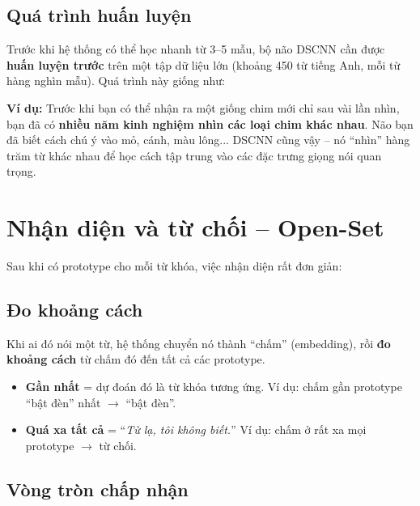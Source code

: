 \documentclass[12pt,a4paper]{article}
\begin{document}
\subsection{Quá trình huấn luyện}

Trước khi hệ thống có thể học nhanh từ 3--5 mẫu, bộ não DSCNN cần được
\textbf{huấn luyện trước} trên một tập dữ liệu lớn (khoảng 450 từ tiếng Anh,
mỗi từ hàng nghìn mẫu). Quá trình này giống như:

\begin{examplebox}
\textbf{Ví dụ:} Trước khi bạn có thể nhận ra một giống chim mới chỉ sau vài lần
nhìn, bạn đã có \textbf{nhiều năm kinh nghiệm nhìn các loại chim khác nhau}.
Não bạn đã biết cách chú ý vào mỏ, cánh, màu lông... DSCNN cũng vậy -- nó
``nhìn'' hàng trăm từ khác nhau để học cách tập trung vào các đặc trưng
giọng nói quan trọng.
\end{examplebox}


\section{Nhận diện và từ chối -- Open-Set}

Sau khi có prototype cho mỗi từ khóa, việc nhận diện rất đơn giản:

\subsection{Đo khoảng cách}

Khi ai đó nói một từ, hệ thống chuyển nó thành ``chấm'' (embedding), rồi
\textbf{đo khoảng cách} từ chấm đó đến tất cả các prototype.

\begin{itemize}[leftmargin=1.5cm]
    \item \textbf{Gần nhất} = dự đoán đó là từ khóa tương ứng.
          Ví dụ: chấm gần prototype ``bật đèn'' nhất $\rightarrow$ ``bật đèn''.
    \item \textbf{Quá xa tất cả} = ``\textit{Từ lạ, tôi không biết.}''
          Ví dụ: chấm ở rất xa mọi prototype $\rightarrow$ từ chối.
\end{itemize}

\subsection{Vòng tròn chấp nhận}
\end{document}
